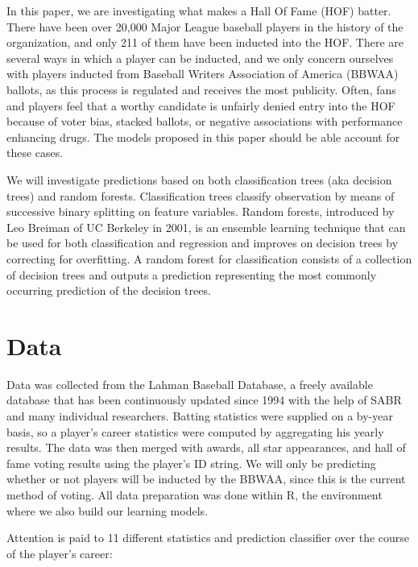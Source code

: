 \documentclass[preprint,12pt]{elsarticle}
\begin{document}
In this paper, we are investigating what makes a Hall Of Fame (HOF) batter. There have been over 20,000 Major League baseball players in the history of the organization, and only 211 of them have been inducted into the HOF. There are several ways in which a player can be inducted, and we only concern ourselves with players inducted from Baseball Writers Association of America (BBWAA) ballots, as this process is regulated and receives the most publicity. Often, fans and players feel that a worthy candidate is unfairly denied entry into the HOF because of voter bias, stacked ballots, or negative associations with performance enhancing drugs. The models proposed in this paper should be able account for these cases.

We will investigate predictions based on both classification trees (aka decision trees) and random forests. Classification trees classify observation by means of successive binary splitting on feature variables. Random forests, introduced by Leo Breiman of UC Berkeley in 2001, is an ensemble learning technique that can be used for both classification and regression and improves on decision trees by correcting for overfitting. A random forest for classification consists of a collection of decision trees and outputs a prediction representing the most commonly occurring prediction of the decision trees.

\section{Data}
\label{data}
Data was collected from the Lahman Baseball Database, a freely available database that has been continuously updated since 1994 with the help of SABR and many individual researchers. Batting statistics were supplied on a by-year basis, so a player's career statistics were computed by aggregating his yearly results. The data was then merged with awards, all star appearances, and hall of fame voting results using the player's ID string. We will only be predicting whether or not players will be inducted by the BBWAA, since this is the current method of voting. All data preparation was done within R, the environment where we also build our learning models. 

Attention is paid to 11 different statistics and prediction classifier over the course of the player's career:
\end{document}
